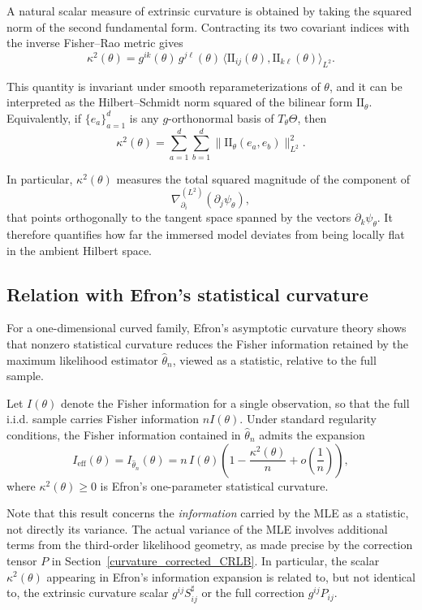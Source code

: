 \documentclass[11pt,letterpaper]{amsart}
\numberwithin{equation}{section}
\theoremstyle{plain}
\theoremstyle{definition}
\theoremstyle{remark}
\begin{document}
A natural scalar measure of extrinsic curvature is obtained by taking the squared norm of the second fundamental form. Contracting its two covariant indices with the inverse Fisher--Rao metric gives
\begin{equation*}
\kappa^2(\theta)
=
g^{ik}(\theta)\,g^{j\ell}(\theta)\,
\langle \mathrm{II}_{ij}(\theta),\mathrm{II}_{k\ell}(\theta)\rangle_{L^2}.
\end{equation*}

This quantity is invariant under smooth reparameterizations of \(\theta\), and it can be interpreted as the Hilbert--Schmidt norm squared of the bilinear form \(\mathrm{II}_\theta\). Equivalently, if \(\{e_a\}_{a=1}^d\) is any \(g\)-orthonormal basis of \(T_\theta\Theta\), then
\[
\kappa^2(\theta)
=
\sum_{a=1}^d\sum_{b=1}^d
\big\|\mathrm{II}_\theta(e_a,e_b)\big\|_{L^2}^2.
\]

In particular, \(\kappa^2(\theta)\) measures the total squared magnitude of the component of
\[
\nabla^{(L^2)}_{\partial_i}(\partial_j\psi_\theta),
\]
that points orthogonally to the tangent space spanned by the vectors \(\partial_k\psi_\theta\). It therefore quantifies how far the immersed model deviates from being locally flat in the ambient Hilbert space.

\subsection{Relation with Efron's statistical curvature}

For a one-dimensional curved family, Efron's asymptotic curvature theory shows that nonzero statistical curvature reduces the Fisher information retained by the maximum likelihood estimator \(\hat\theta_n\), viewed as a statistic, relative to the full sample.

Let \(I(\theta)\) denote the Fisher information for a single observation, so that the full i.i.d. sample carries Fisher information \(nI(\theta)\). Under standard regularity conditions, the Fisher information contained in \(\hat\theta_n\) admits the expansion
\begin{equation*}
I_{\mathrm{eff}}(\theta)
=
I_{\hat\theta_n}(\theta)
=
n\,I(\theta)
\left(
1-\frac{\kappa^2(\theta)}{n}
+
o\!\left(\frac{1}{n}\right)
\right),
\end{equation*}
where \(\kappa^2(\theta)\ge 0\) is Efron's one-parameter statistical curvature.

Note that this result concerns the \emph{information} carried by the MLE as a statistic, not directly its variance. The actual variance of the MLE involves additional terms from the third-order likelihood geometry, as made precise by the correction tensor \(P\) in Section~\ref{curvature_corrected_CRLB}. In particular, the scalar \(\kappa^2(\theta)\) appearing in Efron's information expansion is related to, but not identical to, the extrinsic curvature scalar \(g^{ij}S^\sharp_{ij}\) or the full correction \(g^{ij}P_{ij}\).
\end{document}
